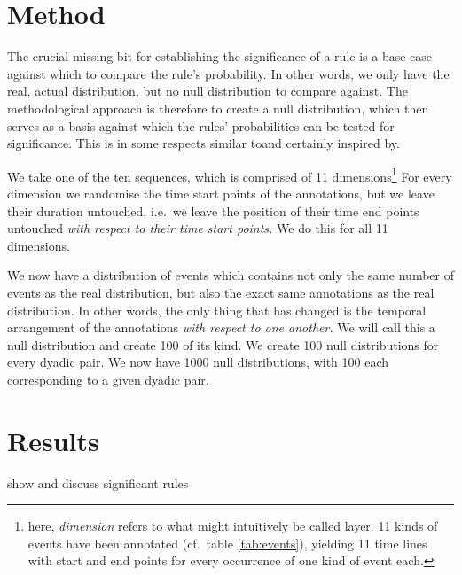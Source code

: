 \section{Method}
\label{sec:significancemethod}
The crucial missing bit for establishing the significance of a rule is a base case against which to compare the rule's probability. In other words, we only have the real, actual distribution, but no null distribution to compare against. The methodological approach is therefore to create a null distribution, which then serves as a basis against which the rules' probabilities can be tested for significance. This is in some respects similar to\dash and certainly inspired by\dash \citet[]{abuzhaya17}.

We take one of the ten sequences, which is comprised of 11 dimensions\footnote{here, \emph{dimension} refers to what might intuitively be called layer. 11 kinds of events have been annotated (cf.~table \ref{tab:events}), yielding 11 time lines with start and end points for every occurrence of one kind of event each.} %
For every dimension we randomise the time start points of the annotations, but we leave their duration untouched, i.e.~we leave the position of their time end points untouched \emph{with respect to their time start points.} We do this for all 11 dimensions.

We now have a distribution of events which contains not only the same number of events as the real distribution, but also the exact same annotations as the real distribution. In other words, the only thing that has changed is the temporal arrangement of the annotations \emph{with respect to one another.} We will call this a null distribution and create 100 of its kind. %
We create 100 null distributions for every dyadic pair. %
We now have 1000 null distributions, with 100 each corresponding to a given dyadic pair.
%

\section{Results}
\label{sec:significanceresults}
show and discuss significant rules